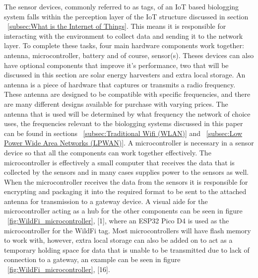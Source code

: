 \documentclass[sigplan,screen,nonacm]{acmart}
\begin{document}
The sensor devices, commonly referred to as tags, of an IoT based biologging system falls within the perception layer of the IoT 
structure discussed in section ~\ref{subsec:What is the Internet of Things}. This means it is responsible 
for interacting with the environment to collect data and sending it to the network layer. To complete these 
tasks, four main hardware components work together: antenna, microcontroller, battery and of course, sensor(s). 
Theses devices can also have optional components that improve it's performance, two that will be discussed in 
this section are solar energy harvesters and extra local storage. 
An antenna is a piece of hardware that captures or transmits a radio frequency. These antenna are designed to 
be compatible with specific frequencies\cite{Sheldon_2023}, and there are many different designs available for 
purchase with varying prices. The antenna that is used will be determined by what frequency the network of choice 
uses, the frequencies relevant to the biologging systems discussed in this paper can be found in sections 
~\ref{subsec:Traditional Wifi (WLAN)} and ~\ref{subsec:Low Power Wide Area Networks (LPWAN)}.
A microcontroller is necessary in a sensor device so that all the components can work together effectively. The 
microcontroller is effectively a small computer that receives the data that is collected by the sensors and in 
many cases supplies power to the sensors as well. When the microcontroller receives the data from the sensors 
it is responsible for encrypting and packaging it into the required format to be sent to the attached antenna 
for transmission to a gateway device. A visual aide for the microcontroller acting as a hub for the other 
components can be seen in figure ~\ref{fig:WildFi_microcontroller}, [1], where an ESP32 Pico D4 is used as the 
microcontroller for the WildFi tag. Most microcontrollers will have flash memory to work with, however, 
extra local storage can also be added on to act as a temporary holding space for data that is unable to be 
transmitted due to lack of connection to a gateway, an example can be seen in figure ~\ref{fig:WildFi_microcontroller}, [16].
\end{document}
